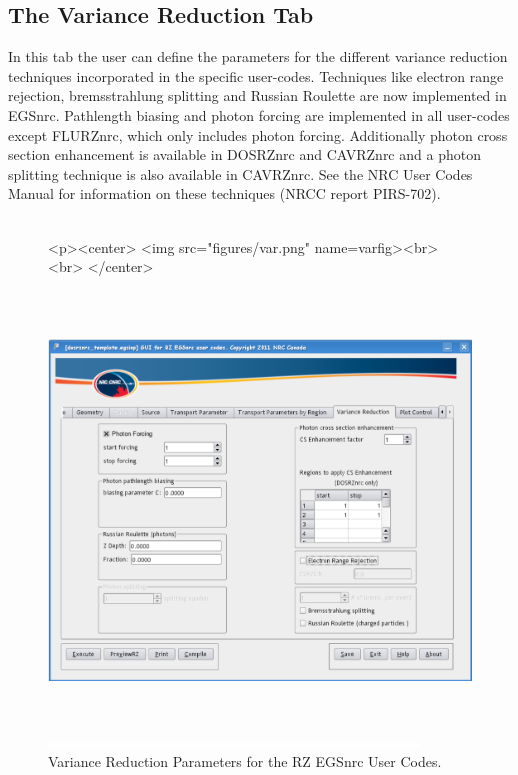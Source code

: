 \documentclass[12pt,twoside]{article}   %
\begin{document}
\newpage
\subsection{The Variance Reduction Tab}

In this tab the user can define the parameters for the different variance reduction techniques
incorporated in the specific user-codes. Techniques like electron range rejection,
bremsstrahlung splitting and Russian Roulette are now implemented in EGSnrc. Pathlength biasing and
photon forcing are implemented in all user-codes except FLURZnrc, which only includes photon
forcing. Additionally photon cross section enhancement is available in DOSRZnrc
and CAVRZnrc and a photon splitting technique is also available in CAVRZnrc.
See the NRC User Codes Manual for information on these techniques (NRCC report PIRS-702\cite{Ro10}).
\\ \\

\begin{figure}[htb]
\begin{htmlonly}
\begin{rawhtml}
<p><center>
<img src="figures/var.png" name=varfig><br><br>
</center>
\end{rawhtml}
\end{htmlonly}
\begin{latexonly}
\begin{center}
\includegraphics[height=11.56cm]{figures/var}
\end{center}
\end{latexonly}
\begin{center}
\includegraphics[height=1mm]{figures/fake2}
\end{center}
\caption{Variance Reduction Parameters for the RZ EGSnrc User Codes.}
\label{varfig}
\end{figure}
\end{document}
